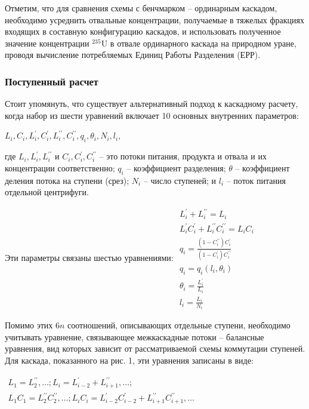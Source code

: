 Отметим, что для сравнения схемы с бенчмарком -- ординарным каскадом, необходимо усреднить отвальные концентрации, получаемые в тяжелых фракциях входящих в составную конфигурацию каскадов, и использовать полученное значение концентрации $^{235}$U в отвале ординарного каскада на природном уране, проводя вычисление потребляемых Единиц Работы Разделения (ЕРР).




\subsubsection{Поступенный расчет}
Стоит упомянуть, что существует альтернативный подход к каскадному расчету, когда набор из шести уравнений включает 10 основных внутренних параметров:

$L_{i}, C_{i}, L_{i}^{\prime}, C_{i}^{\prime}, L_{i}^{\prime \prime}, C_{i}^{\prime \prime}, q_{i}, \theta_{i}, N_{i}, l_{i}$,

где $L_{i}, L_{i}^{\prime}, L_{i}^{\prime \prime}$ и $C_{i}, C_{i}^{\prime}, C_{i}^{\prime \prime}$ -- 
это потоки питания, продукта и отвала и их концентрации соответственно; $q_{i}$ -- коэффициент разделения; $\theta$ -- коэффициент деления потока на ступени (срез); $N_{i}$ -- число ступеней; и $l_{i}$ -- поток питания отдельной центрифуги.

Эти параметры связаны шестью уравнениями:
$\begin{array}{c}
  {L_{i}^{\prime}+L_{i}^{\prime \prime}=L_{i}} \\
  {L_{i}^{\prime} C_{i}^{\prime}+L_{i}^{\prime \prime} C_{i}^{\prime \prime}=L_{i} C_{i}} \\
  {q_{i}=\frac{(1-C_{i}^{\prime \prime}) C_{i}^{\prime}}{(1-C_{i}^{\prime}) C_{i}^{\prime \prime}}} \\
  {q_{i}=q_{i}\left(l_{i}, \theta_{i}\right)} \\
  {\theta_{i}=\frac{L_{i}^{\prime}}{L_{i}}} \\
  {l_{i}=\frac{L_{i}}{N_{i}}}
\end{array}$

Помимо этих 6$n$ соотношений, описывающих отдельные ступени, необходимо учитывать уравнение, связывающее межкаскадные потоки -- балансные уравнения, вид которых зависит от рассматриваемой схемы коммутации ступеней. Для каскада, показанного на рис. 1, эти уравнения записаны в виде:

$\begin{array}{c}
  {L_{1}=L_{2}^{\prime \prime}, \ldots ; L_{i}=L_{i-2}^{\prime}+L_{i+1}^{\prime \prime}, \ldots ;} \\
  {L_{1} C_{1}=L_{2}^{\prime \prime} C_{2}^{\prime \prime}, \ldots ; L_{i} C_{i}=L_{i-2}^{\prime} C_{i-2}^{\prime}+L_{i+1}^{\prime \prime} C_{i+1}^{\prime \prime}, \ldots}
\end{array}$

